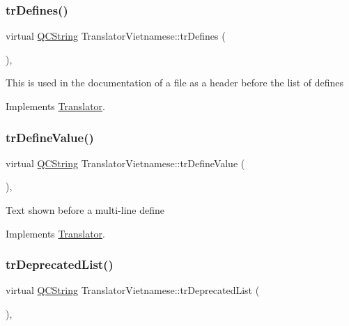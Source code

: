 \subsubsection{\texorpdfstring{trDefines()}{trDefines()}}
{\footnotesize\ttfamily virtual \mbox{\hyperlink{class_q_c_string}{Q\+C\+String}} Translator\+Vietnamese\+::tr\+Defines (\begin{DoxyParamCaption}{ }\end{DoxyParamCaption})\hspace{0.3cm}{\ttfamily [inline]}, {\ttfamily [virtual]}}

This is used in the documentation of a file as a header before the list of defines 

Implements \mbox{\hyperlink{class_translator}{Translator}}.

\mbox{\label{class_translator_vietnamese_a15d8810651f40d0d83549f27adb640a2}} 
\subsubsection{\texorpdfstring{trDefineValue()}{trDefineValue()}}
{\footnotesize\ttfamily virtual \mbox{\hyperlink{class_q_c_string}{Q\+C\+String}} Translator\+Vietnamese\+::tr\+Define\+Value (\begin{DoxyParamCaption}{ }\end{DoxyParamCaption})\hspace{0.3cm}{\ttfamily [inline]}, {\ttfamily [virtual]}}

Text shown before a multi-\/line define 

Implements \mbox{\hyperlink{class_translator}{Translator}}.

\mbox{\label{class_translator_vietnamese_abeaca8aa5e62d5f3dc46deabc410f7f3}} 
\subsubsection{\texorpdfstring{trDeprecatedList()}{trDeprecatedList()}}
{\footnotesize\ttfamily virtual \mbox{\hyperlink{class_q_c_string}{Q\+C\+String}} Translator\+Vietnamese\+::tr\+Deprecated\+List (\begin{DoxyParamCaption}{ }\end{DoxyParamCaption})\hspace{0.3cm}{\ttfamily [inline]}, {\ttfamily [virtual]}}


